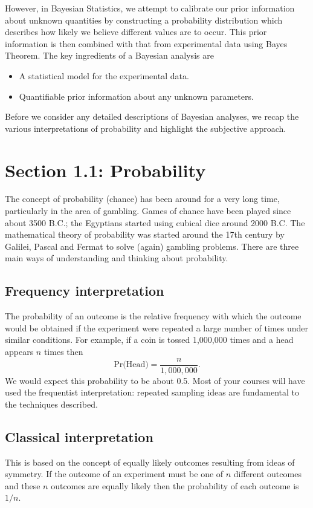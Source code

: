 However, in Bayesian Statistics, we attempt to calibrate our prior
information about unknown quantities by constructing a probability
distribution which describes how likely we believe different values
are to occur. This prior information is then combined with that from
experimental data using Bayes Theorem. The key ingredients of a
Bayesian analysis are
\begin{itemize}
\item A statistical model for the experimental data.
\item Quantifiable prior information about any unknown parameters.
\end{itemize}
Before we consider any detailed descriptions of Bayesian analyses, we
recap the various interpretations of probability and highlight the
subjective approach.

\section{Section 1.1: Probability}
The concept of probability (chance) has been around for a very long
time, particularly in the area of gambling. Games of chance have been
played since about 3500 B.C.; the Egyptians started using cubical dice
around 2000 B.C. The mathematical theory of probability was started
around the 17th century by Galilei, Pascal and Fermat to solve (again)
gambling problems. There are three main ways of understanding and
thinking about probability.

\subsection*{Frequency interpretation}
The probability of an outcome is the relative frequency with which the
outcome would be obtained if the experiment were repeated a large
number of times under similar conditions. For example, if a coin is
tossed 1,000,000 times and a head appears $n$ times then
$$
\text{Pr(Head)}=\frac{n}{1,000,000}.
$$ 
We would expect this probability to be about 0.5.  Most of your
courses will have used the frequentist interpretation: repeated
sampling ideas are fundamental to the techniques described.

\subsection*{Classical interpretation}
This is based on the concept of equally likely outcomes resulting from
ideas of symmetry. If the
outcome of an experiment must be one of $n$ different outcomes and
these $n$ outcomes are equally likely then the probability of each
outcome is $1/n$.

